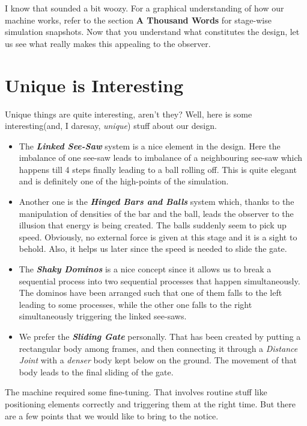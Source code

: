 \documentclass[a4paper,11pt]{article}
\begin{document}
I know that sounded a bit woozy. For a graphical understanding of how our machine works, refer to the section \textbf{A Thousand Words} for stage-wise simulation snapshots. Now that you understand what constitutes the design, let us see what really makes this appealing to the observer.

\section{Unique is Interesting}

Unique things are quite interesting, aren't they? Well, here is some interesting(and, I daresay, \emph{unique}) stuff about our design.

\begin{itemize}
\item The \textbf{\emph{Linked See-Saw}} system is a nice element in the design. Here the imbalance of one see-saw leads to imbalance of a neighbouring see-saw which happens till 4 steps finally leading to a ball rolling off. This is quite elegant and is definitely one of the high-points of the simulation.
\item Another one is the \textbf{\emph{Hinged Bars and Balls}} system which, thanks to the manipulation of densities of the bar and the ball, leads the observer to the illusion that energy is being created. The balls suddenly seem to pick up speed. Obviously, no external force is given at this stage and it is a sight to behold. Also, it helps us later since the speed is needed to slide the gate.
\item The \textbf{\emph{Shaky Dominos}} is a nice concept since it allows us to break a sequential process into two sequential processes that happen simultaneously. The dominos have been arranged such that one of them falls to the left leading to some processes, while the other one falls to the right simultaneously triggering the linked see-saws.
\item We prefer the \textbf{\emph{Sliding Gate}} personally. That has been created by putting a rectangular body among frames, and then connecting it through a \emph{Distance Joint} with a \emph{denser} body kept below on the ground. The movement of that body leads to the final sliding of the gate.
\end{itemize}

The machine required some fine-tuning. That involves routine stuff like positioning elements correctly and triggering them at the right time. But there are a few points that we would like to bring to the notice.
\end{document}
